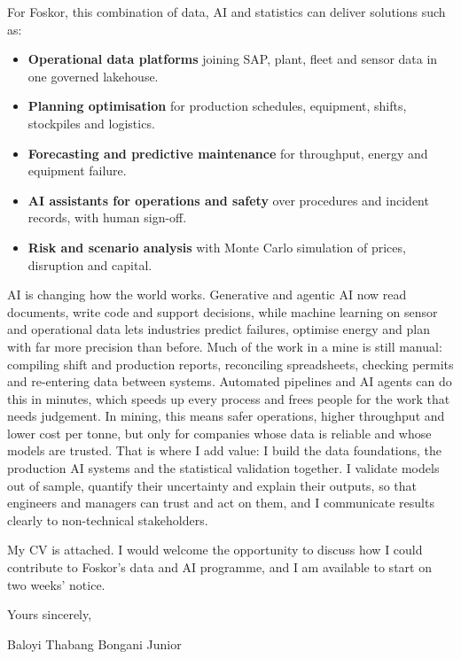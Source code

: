 \documentclass[a4paper,11pt]{article}
\begin{document}
For Foskor, this combination of data, AI and statistics can deliver solutions such as:
\begin{itemize}[leftmargin=0.2in,itemsep=1pt,topsep=0pt]
    \item \textbf{Operational data platforms} joining SAP, plant, fleet and sensor data in one governed lakehouse.
    \item \textbf{Planning optimisation} for production schedules, equipment, shifts, stockpiles and logistics.
    \item \textbf{Forecasting and predictive maintenance} for throughput, energy and equipment failure.
    \item \textbf{AI assistants for operations and safety} over procedures and incident records, with human sign-off.
    \item \textbf{Risk and scenario analysis} with Monte Carlo simulation of prices, disruption and capital.
\end{itemize}

AI is changing how the world works. Generative and agentic AI now read documents, write code and
support decisions, while machine learning on sensor and operational data lets industries predict
failures, optimise energy and plan with far more precision than before. Much of the work in a mine is
still manual: compiling shift and production reports, reconciling spreadsheets, checking permits and
re-entering data between systems. Automated pipelines and AI agents can do this in minutes, which speeds
up every process and frees people for the work that needs judgement. In mining, this means safer
operations, higher throughput and lower cost per tonne, but only for companies whose data is reliable
and whose models are trusted. That is where I add value: I build the data foundations, the production
AI systems and the statistical validation together. I validate models out of sample, quantify their
uncertainty and explain their outputs, so that engineers and managers can trust and act on them, and
I communicate results clearly to non-technical stakeholders.

My CV is attached. I would welcome the opportunity to discuss how I could contribute to Foskor's data and
AI programme, and I am available to start on two weeks' notice.

Yours sincerely,

\vspace{2pt}
Baloyi Thabang Bongani Junior
\end{document}
